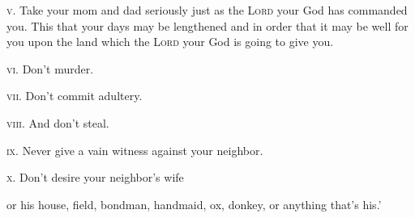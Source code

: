 \begin{inparaenum}
     \textsc{v.} Take your mom and dad seriously just as the \textsc{Lord} your God has commanded you. This that your days may be lengthened and in order that it may be well for you upon the land which the \textsc{Lord} your God is going to give you.%
    
     \textsc{vi.} Don't murder.%
    
     \textsc{vii.} Don't commit adultery.%
    
     \textsc{viii.} And don't steal.%
    
     \textsc{ix.} Never give a vain witness against your neighbor.%
    
     \textsc{x.} Don't desire your neighbor's wife
    
    or his house, field, bondman, handmaid, ox, donkey, or anything that's his.'%
    

\end{inparaenum}
